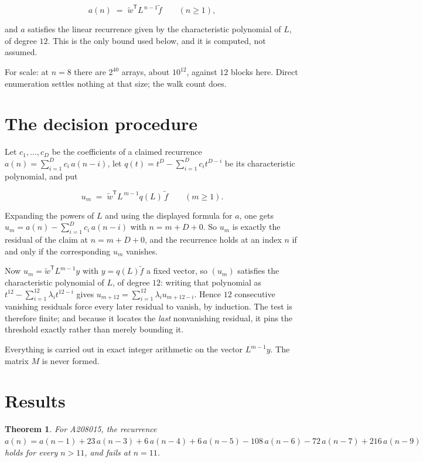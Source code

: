 \documentclass[11pt]{article}
\newtheorem{theorem}{Theorem}
\theoremstyle{definition}
\begin{document}
\[a(n) \;=\; \tilde w^{\mathsf T} L^{\,n-1} \tilde f \qquad (n \ge 1),\]

and $a$ satisfies the linear recurrence given by the characteristic polynomial of $L$, of degree $12$. This is the only bound used below, and it is computed, not assumed.

For scale: at $n = 8$ there are $2^{40}$ arrays, about $10^{12}$, against $12$ blocks here. Direct enumeration settles nothing at that size; the walk count does.

\section{The decision procedure}

Let $c_1,\dots,c_D$ be the coefficients of a claimed recurrence $a(n) = \sum_{i=1}^{D} c_i\,a(n-i)$, let $q(t) = t^{D} - \sum_{i=1}^{D} c_i t^{D-i}$ be its characteristic polynomial, and put

\[u_m \;=\; \tilde w^{\mathsf T} L^{\,m-1} q(L)\,\tilde f \qquad (m \ge 1).\]

Expanding the powers of $L$ and using the displayed formula for $a$, one gets $u_m = a(n) - \sum_{i=1}^{D} c_i\,a(n-i)$ with $n = m + D + 0$. So $u_m$ is exactly the residual of the claim at $n = m + D + 0$, and the recurrence holds at an index $n$ if and only if the corresponding $u_m$ vanishes.

Now $u_m = \tilde w^{\mathsf T} L^{m-1} y$ with $y = q(L)\tilde f$ a fixed vector, so $(u_m)$ satisfies the characteristic polynomial of $L$, of degree $12$: writing that polynomial as $t^{12} - \sum_{i=1}^{12} \lambda_i t^{12-i}$ gives $u_{m+12} = \sum_{i=1}^{12} \lambda_i u_{m+12-i}$. Hence $12$ consecutive vanishing residuals force every later residual to vanish, by induction. The test is therefore finite; and because it locates the {\itshape last} nonvanishing residual, it pins the threshold exactly rather than merely bounding it.

Everything is carried out in exact integer arithmetic on the vector $L^{m-1}y$. The matrix $M$ is never formed.

\section{Results}

\begin{theorem} For A208015, the recurrence $a(n) = a(n-1) + 23\,a(n-3) + 6\,a(n-4) + 6\,a(n-5) - 108\,a(n-6) - 72\,a(n-7) + 216\,a(n-9)$ holds for every $n > 11$, and fails at $n = 11$.\end{theorem}
\end{document}
